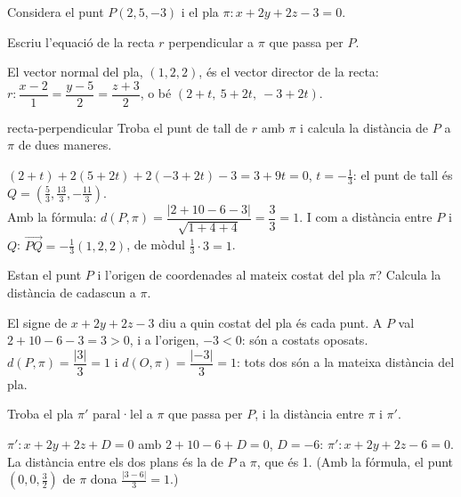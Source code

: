 Considera el punt $P(2,5,-3)$ i el pla $\pi\colon x+2y+2z-3=0$.

\begin{apartats}

Escriu l'equació de la recta $r$ perpendicular a $\pi$ que passa per $P$.

\begin{solucio}
El vector normal del pla, $(1,2,2)$, és el vector director de la recta:
$r\colon\dfrac{x-2}{1}=\dfrac{y-5}{2}=\dfrac{z+3}{2}$, o bé $(2+t,\ 5+2t,\ -3+2t)$.
\end{solucio}

\begin{tria}{recta-perpendicular}
Troba el punt de tall de $r$ amb $\pi$ i calcula la distància de $P$ a $\pi$ de dues maneres.

\begin{solucio}
$(2+t)+2(5+2t)+2(-3+2t)-3=3+9t=0$, $t=-\frac13$: el punt de tall és
$Q=\left(\frac53,\frac{13}3,-\frac{11}3\right)$.\\
Amb la fórmula: $d(P,\pi)=\dfrac{|2+10-6-3|}{\sqrt{1+4+4}}=\dfrac33=1$. I com a distància entre $P$ i
$Q$: $\overrightarrow{PQ}=-\frac13(1,2,2)$, de mòdul $\frac13\cdot3=1$.
\end{solucio}

Estan el punt $P$ i l'origen de coordenades al mateix costat del pla $\pi$? Calcula la distància de
cadascun a $\pi$.

\begin{solucio}
El signe de $x+2y+2z-3$ diu a quin costat del pla és cada punt. A $P$ val $2+10-6-3=3>0$, i a
l'origen, $-3<0$: són a costats oposats.\\
$d(P,\pi)=\dfrac{|3|}{3}=1$ i $d(O,\pi)=\dfrac{|-3|}{3}=1$: tots dos són a la mateixa distància del pla.
\end{solucio}
\end{tria}

\begin{nomesllarg}
Troba el pla $\pi'$ paral·lel a $\pi$ que passa per $P$, i la distància entre $\pi$ i $\pi'$.

\begin{solucio}
$\pi'\colon x+2y+2z+D=0$ amb $2+10-6+D=0$, $D=-6$: $\pi'\colon x+2y+2z-6=0$. La distància entre els
dos plans és la de $P$ a $\pi$, que és 1. (Amb la fórmula, el punt $(0,0,\frac32)$ de $\pi$ dona
$\frac{|3-6|}{3}=1$.)
\end{solucio}
\end{nomesllarg}

\end{apartats}
